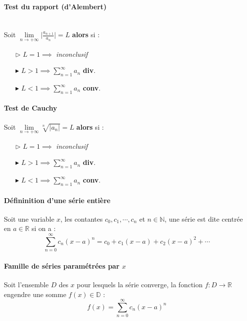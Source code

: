 \documentclass{report}
\begin{document}
\begin{multicols*}{3}
  \paragraph{Test du rapport (d'Alembert)}
  \mbox{}\vspace{0.2em}\\
  Soit $\lim\limits_{n \to+\infty } \Big|\frac{a_{n+1}}{a_n}  \Big| = L$ 
  \textbf{alors} si :   
  \begin{itemize}
    \item [$\rhd$ ] $L = 1 \implies$ \textit{ inconclusif}  
    \item [$\blacktriangleright$ ] $L > 1 \implies \sum_{n=1}^{\infty } a_n$ 
      \textbf{div}.   
    \item [$\blacktriangleright$ ] $L < 1 \implies \sum_{n=1}^{\infty } a_n$ \textbf{conv}.   
  \end{itemize}



  \paragraph{Test de Cauchy}
  \mbox{}\vspace{0.2em}
  Soit $\lim\limits_{n \to+\infty } \sqrt[n]{\big| a_n \big|} = L$ 
  \textbf{alors} si :   
  \begin{itemize}
    \item [$\rhd$ ] $L = 1 \implies$ \textit{inconclusif}  
    \item [$\blacktriangleright$ ] $L > 1 \implies \sum_{n=1}^{\infty }a_n$ 
      \textbf{div}.   
    \item [$\blacktriangleright$ ] $L < 1 \implies \sum_{n=1}^{\infty }a_n$ 
      \textbf{conv}.
  \end{itemize}

  \paragraph{Défininition d'une série entière} Soit une variable 
  $x$, les contantes $c_0, c_1, \cdots , c_n$ 
  et $n \in \mathbb{N}$, une série 
  est dite centrée en $a \in \mathbb{R}$ si on a :  
  \[ \sum_{n=0}^{\infty } c_n(x-a)^n = c_0 + c_1(x-a) + c_2(x-a)^2 + \cdots \]

  \paragraph{Famille de séries paramétrées par $x$} 
  Soit l'ensemble $D$ des $x$ pour lesquels la série converge, 
  la fonction $f : D \rightarrow  \mathbb{R}$ engendre une 
  somme $f(x) \in \mathbb{D}$ :
  \[ f(x) = \sum_{n=0}^{\infty } c_n(x - a)^n \]
  \vspace{-1.5em} %


\end{multicols*}
\end{document}
